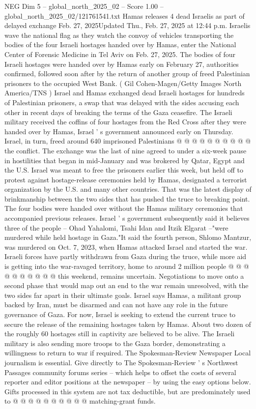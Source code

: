 \begin{textsample}{NEG Dim 5 – global\_north\_2025\_02 – Score 1.00 – global\_north\_2025\_02/121761541.txt}  \label{ex:f5_neg_249}
Hamas releases 4 dead Israelis as part of delayed exchange Feb. 27, 2025Updated Thu., Feb. 27, 2025 at 12:44 p.m.
Israelis wave the national flag as they watch the convoy of vehicles transporting the bodies of the four Israeli hostages handed over by Hamas, enter the National Center of Forensic Medicine in Tel Aviv on Feb. 27, 2025.
The bodies of four Israeli hostages were handed over by Hamas early on February 27, authorities confirmed, followed soon after by the return of another group of freed Palestinian prisoners to the occupied West Bank. ( Gil Cohen-Magen/Getty Images North America/TNS ) Israel and Hamas exchanged dead Israeli hostages for hundreds of Palestinian prisoners, a swap that was delayed with the sides accusing each other in recent days of breaking the terms of the Gaza ceasefire.
The Israeli military received the coffins of four hostages from the Red Cross after they were handed over by Hamas, Israel ' s government announced early on Thursday.
Israel, in turn, freed around 640 imprisoned Palestinians @ @ @ @ @ @ @ @ @ @ the conflict.
The exchange was the last of nine agreed to under a six-week pause in hostilities that began in mid-January and was brokered by Qatar, Egypt and the U.S.
Israel was meant to free the prisoners earlier this week, but held off to protest against hostage-release ceremonies held by Hamas, designated a terrorist organization by the U.S. and many other countries.
That was the latest display of brinkmanship between the two sides that has pushed the truce to breaking point.
The four bodies were handed over without the Hamas military ceremonies that accompanied previous releases.
Israel ' s government subsequently said it believes three of the people -- Ohad Yahalomi, Tsahi Idan and Itzik Elgarat --"were murdered while held hostage in Gaza."It said the fourth person, Shlomo Mantzur, was murdered on Oct. 7, 2023, when Hamas attacked Israel and started the war.
Israeli forces have partly withdrawn from Gaza during the truce, while more aid is getting into the war-ravaged territory, home to around 2 million people @ @ @ @ @ @ @ @ @ @ this weekend, remains uncertain.
Negotiations to move onto a second phase that would map out an end to the war remain unresolved, with the two sides far apart in their ultimate goals.
Israel says Hamas, a militant group backed by Iran, must be disarmed and can not have any role in the future governance of Gaza.
For now, Israel is seeking to extend the current truce to secure the release of the remaining hostages taken by Hamas.
About two dozen of the roughly 60 hostages still in captivity are believed to be alive.
The Israeli military is also sending more troops to the Gaza border, demonstrating a willingness to return to war if required.
The Spokesman-Review Newspaper Local journalism is essential.
Give directly to The Spokesman-Review ' s Northwest Passages community forums series -- which helps to offset the costs of several reporter and editor positions at the newspaper -- by using the easy options below.
Gifts processed in this system are not tax deductible, but are predominately used to @ @ @ @ @ @ @ @ @ @ matching-grant funds.

\end{textsample}
